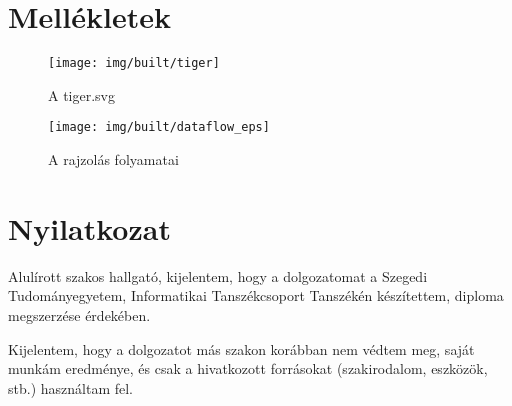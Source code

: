 \documentclass[12pt]{report}
\theoremstyle{definition}
\begin{document}
    \chapter*{Mellékletek}


  \begin{figure}[!htb]
  \begin{center}
    \texttt{[image: img/built/tiger]}
  \end{center}
    \caption{\label{tiger} A tiger.svg}
  \end{figure}

  \begin{figure}[!htb]
  \begin{center}
    \texttt{[image: img/built/dataflow\_eps]}
  \end{center}
    \caption{\label{dataflow_eps} A rajzolás folyamatai}
  \end{figure}



    \chapter*{Nyilatkozat}




    \noindent

Alulírott \makebox[4cm]{\dotfill} szakos hallgató, kijelentem, hogy a dolgozatomat a Szegedi Tudományegyetem, Informatikai Tanszékcsoport \makebox[4cm]{\dotfill} Tanszékén készítettem, \makebox[4cm]{\dotfill} diploma megszerzése érdekében.

Kijelentem, hogy a dolgozatot más szakon korábban nem védtem meg, saját munkám eredménye, és csak a hivatkozott forrásokat (szakirodalom, eszközök, stb.) használtam fel.
\end{document}
